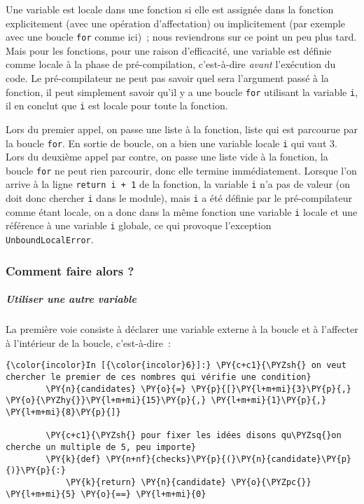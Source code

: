 Une variable est locale dans une fonction si elle est assignée dans la
fonction explicitement (avec une opération d'affectation) ou
implicitement (par exemple avec une boucle \texttt{for} comme ici)~;
nous reviendrons sur ce point un peu plus tard. Mais pour les fonctions,
pour une raison d'efficacité, une variable est définie comme locale à la
phase de pré-compilation, c'est-à-dire \emph{avant} l'exécution du code.
Le pré-compilateur ne peut pas savoir quel sera l'argument passé à la
fonction, il peut simplement savoir qu'il y a une boucle \texttt{for}
utilisant la variable \texttt{i}, il en conclut que \texttt{i} est
locale pour toute la fonction.

Lors du premier appel, on passe une liste à la fonction, liste qui est
parcourue par la boucle \texttt{for}. En sortie de boucle, on a bien une
variable locale \texttt{i} qui vaut 3. Lors du deuxième appel par
contre, on passe une liste vide à la fonction, la boucle \texttt{for} ne
peut rien parcourir, donc elle termine immédiatement. Lorsque l'on
arrive à la ligne \texttt{return\ i\ +\ 1} de la fonction, la variable
\texttt{i} n'a pas de valeur (on doit donc chercher \texttt{i} dans le
module), mais \texttt{i} a été définie par le pré-compilateur comme
étant locale, on a donc dans la même fonction une variable \texttt{i}
locale et une référence à une variable \texttt{i} globale, ce qui
provoque l'exception \texttt{UnboundLocalError}.

    \hypertarget{comment-faire-alors}{%
\subsubsection{Comment faire alors ?}\label{comment-faire-alors}}

    \hypertarget{utiliser-une-autre-variable}{%
\subparagraph{Utiliser une autre
variable}\label{utiliser-une-autre-variable}}

    La première voie consiste à déclarer une variable externe à la boucle et
à l'affecter à l'intérieur de la boucle, c'est-à-dire~:

    \begin{Verbatim}[commandchars=\\\{\}]
{\color{incolor}In [{\color{incolor}6}]:} \PY{c+c1}{\PYZsh{} on veut chercher le premier de ces nombres qui vérifie une condition}
        \PY{n}{candidates} \PY{o}{=} \PY{p}{[}\PY{l+m+mi}{3}\PY{p}{,} \PY{o}{\PYZhy{}}\PY{l+m+mi}{15}\PY{p}{,} \PY{l+m+mi}{1}\PY{p}{,} \PY{l+m+mi}{8}\PY{p}{]}
        
        \PY{c+c1}{\PYZsh{} pour fixer les idées disons qu\PYZsq{}on cherche un multiple de 5, peu importe}
        \PY{k}{def} \PY{n+nf}{checks}\PY{p}{(}\PY{n}{candidate}\PY{p}{)}\PY{p}{:}
            \PY{k}{return} \PY{n}{candidate} \PY{o}{\PYZpc{}} \PY{l+m+mi}{5} \PY{o}{==} \PY{l+m+mi}{0}
\end{Verbatim}


